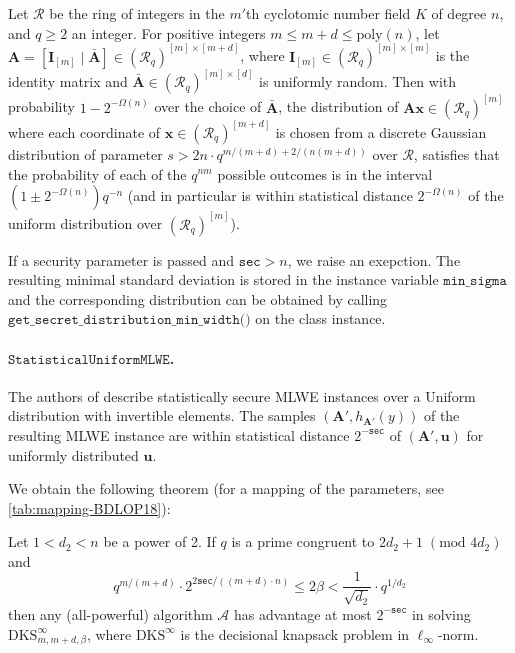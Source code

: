 \begin{theorem}
    Let $\mathcal{R}$ be the ring of integers in the $m'$th cyclotomic number field $K$ of degree $n$, and $q \geq 2$ an integer.
    For positive integers $m \leq m + d \leq \text{poly}(n)$, let $\mathbf{A} = [ \mathbf{I}_{[m]} \mid \bar{\mathbf{A}}] \in (\mathcal{R}_q)^{[m] \times [m+d]}$, where $\mathbf{I}_{[m]} \in (\mathcal{R}_q)^{[m] \times [m]}$ is the identity matrix and $\bar{\mathbf{A}} \in (\mathcal{R}_q)^{[m] \times [d]}$ is uniformly random.
    Then with probability $1 - 2^{-\Omega(n)}$ over the choice of $\bar{\mathbf{A}}$, the distribution of $\mathbf{A}\mathbf{x} \in (\mathcal{R}_q)^{[m]}$ where each coordinate of $\mathbf{x} \in (\mathcal{R}_q)^{[m+d]}$ is chosen from a discrete Gaussian distribution of parameter $s > 2n \cdot q^{m / (m+d) + 2/(n (m+d))}$ over $\mathcal{R}$, satisfies that the probability of each of the $q^{n m}$ possible outcomes is in the interval $(1 \pm 2^{-\Omega(n)}) q^{-n }$ (and in particular is within statistical distance $2^{-\Omega(n)}$ of the uniform distribution over $(\mathcal{R}_q)^{[m]}$). %
\end{theorem}

If a security parameter is passed and $\texttt{sec} > n$, we raise an exepction.
The resulting minimal standard deviation is stored in the instance variable $\texttt{min\_sigma}$ and the corresponding distribution can be obtained by calling $\texttt{get\_secret\_distribution\_min\_width()}$ on the class instance.



\paragraph{$\texttt{StatisticalUniformMLWE}$.} The authors of \cite{BDLOP18} describe statistically secure MLWE instances over a Uniform distribution with invertible elements. The samples $(\mathbf{A}', h_{\mathbf{A}'}(y))$ of the resulting MLWE instance are within statistical distance $2^{-\texttt{sec}}$ of $(\mathbf{A}', \mathbf{u})$ for uniformly distributed $\mathbf{u}$. %

We obtain the following theorem (for a mapping of the parameters, see \cref{tab:mapping-BDLOP18}): %

\begin{theorem}
    Let $1 < d_2 < n$ be a power of 2. If $q$ is a prime congruent to $2d_2 + 1 \;(\text{mod } 4d_2)$ and
    \begin{equation}
        q^{m/(m+d)} \cdot 2^{2 \texttt{sec}/((m+d)\cdot n)} \leq 2 \beta < \frac{1}{\sqrt{d_2}} \cdot q^{1/d_2}
    \end{equation}
    then any (all-powerful) algorithm $\mathcal{A}$ has advantage at most $2^{-\texttt{sec}}$ in solving $\text{DKS}_{m,m+d,\beta}^\infty$, where $\text{DKS}^\infty$ is the decisional knapsack problem in $\ell_\infty$-norm.
\end{theorem}


